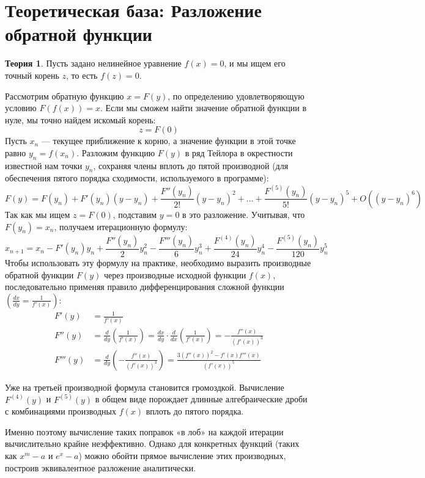 \documentclass[12pt, a4paper]{article}
\theoremstyle{definition}
\newtheorem*{theory}{Теория}
\begin{document}
\section{Теоретическая база: Разложение обратной функции}
\begin{theory}
Пусть задано нелинейное уравнение $f(x) = 0$, и мы ищем его точный корень $z$, то есть $f(z) = 0$. 

Рассмотрим обратную функцию $x = F(y)$, по определению удовлетворяющую условию $F(f(x)) = x$. Если мы сможем найти значение обратной функции в нуле, мы точно найдем искомый корень: 
\[
z = F(0)
\]
Пусть $x_n$ --- текущее приближение к корню, а значение функции в этой точке равно $y_n = f(x_n)$. Разложим функцию $F(y)$ в ряд Тейлора в окрестности известной нам точки $y_n$, сохраняя члены вплоть до пятой производной (для обеспечения пятого порядка сходимости, используемого в программе):
\[
F(y) = F(y_n) + F'(y_n)(y - y_n) + \frac{F''(y_n)}{2!}(y - y_n)^2 + \dots + \frac{F^{(5)}(y_n)}{5!}(y - y_n)^5 + O((y-y_n)^6)
\]
Так как мы ищем $z = F(0)$, подставим $y = 0$ в это разложение. Учитывая, что $F(y_n) = x_n$, получаем итерационную формулу:
\[
x_{n+1} = x_n - F'(y_n)y_n + \frac{F''(y_n)}{2}y_n^2 - \frac{F'''(y_n)}{6}y_n^3 + \frac{F^{(4)}(y_n)}{24}y_n^4 - \frac{F^{(5)}(y_n)}{120}y_n^5
\]
Чтобы использовать эту формулу на практике, необходимо выразить производные обратной функции $F(y)$ через производные исходной функции $f(x)$, последовательно применяя правило дифференцирования сложной функции $\left(\frac{dx}{dy} = \frac{1}{f'(x)}\right)$:
\begin{align*}
F'(y) &= \frac{1}{f'(x)} \\
F''(y) &= \frac{d}{dy}\left(\frac{1}{f'(x)}\right) = \frac{dx}{dy} \cdot \frac{d}{dx}\left(\frac{1}{f'(x)}\right) = -\frac{f''(x)}{(f'(x))^3} \\
F'''(y) &= \frac{d}{dy}\left( -\frac{f''(x)}{(f'(x))^3} \right) = \frac{3(f''(x))^2 - f'(x)f'''(x)}{(f'(x))^5}
\end{align*}
\end{theory}

Уже на третьей производной формула становится громоздкой. Вычисление $F^{(4)}(y)$ и $F^{(5)}(y)$ в общем виде порождает длинные алгебраические дроби с комбинациями производных $f(x)$ вплоть до пятого порядка. 

Именно поэтому вычисление таких поправок «в лоб» на каждой итерации вычислительно крайне неэффективно. Однако для конкретных функций (таких как $x^m - a$ и $e^x - a$) можно обойти прямое вычисление этих производных, построив эквивалентное разложение аналитически.
\end{document}
